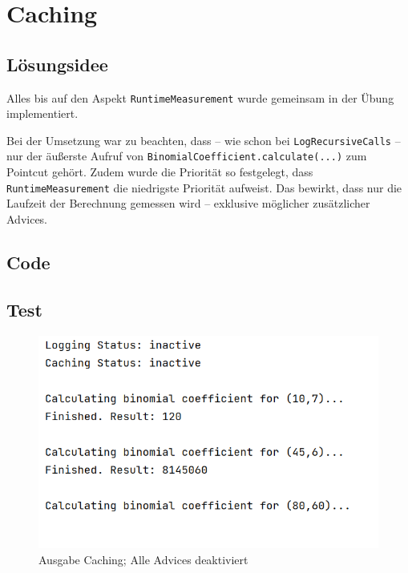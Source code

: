 \documentclass[german,notitlepage,smartquotes]{hgbreport}
\begin{document}

\clearpage

\section{Caching}

\subsection{Lösungsidee}

Alles bis auf den Aspekt \texttt{RuntimeMeasurement} wurde gemeinsam in der Übung implementiert.

Bei der Umsetzung war zu beachten, dass -- wie schon bei \texttt{LogRecursiveCalls} -- nur der äußerste Aufruf von \texttt{BinomialCoefficient.calculate(...)} zum Pointcut gehört. Zudem wurde die Priorität so festgelegt, dass \texttt{RuntimeMeasurement} die niedrigste Priorität aufweist. Das bewirkt, dass nur die Laufzeit der Berechnung gemessen wird -- exklusive möglicher zusätzlicher Advices.

\subsection{Code}







\clearpage

\subsection{Test}

\begin{figure}[h]
\centering
\includegraphics[width=.5\textwidth]{caching-test-00}
\caption{Ausgabe Caching; Alle Advices deaktiviert}
\label{caching-test-00}
\end{figure}
\end{document}
